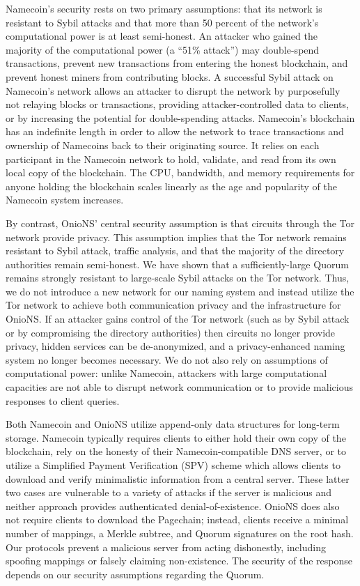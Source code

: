 \documentclass[conference]{IEEEtran}
\begin{document}
Namecoin's security rests on two primary assumptions: that its network is resistant to Sybil attacks and that more than 50 percent of the network's computational power is at least semi-honest. An attacker who gained the majority of the computational power (a ``51\% attack'') may double-spend transactions, prevent new transactions from entering the honest blockchain, and prevent honest miners from contributing blocks. A successful Sybil attack on Namecoin's network allows an attacker to disrupt the network by purposefully not relaying blocks or transactions, providing attacker-controlled data to clients, or by increasing the potential for double-spending attacks. Namecoin's blockchain has an indefinite length in order to allow the network to trace transactions and ownership of Namecoins back to their originating source. It relies on each participant in the Namecoin network to hold, validate, and read from its own local copy of the blockchain. The CPU, bandwidth, and memory requirements for anyone holding the blockchain scales linearly as the age and popularity of the Namecoin system increases.

By contrast, OnioNS' central security assumption is that circuits through the Tor network provide privacy. This assumption implies that the Tor network remains resistant to Sybil attack, traffic analysis, and that the majority of the directory authorities remain semi-honest. We have shown that a sufficiently-large Quorum remains strongly resistant to large-scale Sybil attacks on the Tor network. Thus, we do not introduce a new network for our naming system and instead utilize the Tor network to achieve both communication privacy and the infrastructure for OnioNS. If an attacker gains control of the Tor network (such as by Sybil attack or by compromising the directory authorities) then circuits no longer provide privacy, hidden services can be de-anonymized, and a privacy-enhanced naming system no longer becomes necessary. We do not also rely on assumptions of computational power: unlike Namecoin, attackers with large computational capacities are not able to disrupt network communication or to provide malicious responses to client queries.

Both Namecoin and OnioNS utilize append-only data structures for long-term storage. Namecoin typically requires clients to either hold their own copy of the blockchain, rely on the honesty of their Namecoin-compatible DNS server, or to utilize a Simplified Payment Verification \cite{nakamoto2008bitcoin} (SPV) scheme which allows clients to download and verify minimalistic information from a central server. These latter two cases are vulnerable to a variety of attacks if the server is malicious and neither approach provides authenticated denial-of-existence. OnioNS does also not require clients to download the Pagechain; instead, clients receive a minimal number of mappings, a Merkle subtree, and Quorum signatures on the root hash. Our protocols prevent a malicious server from acting dishonestly, including spoofing mappings or falsely claiming non-existence. The security of the response depends on our security assumptions regarding the Quorum.
\end{document}
